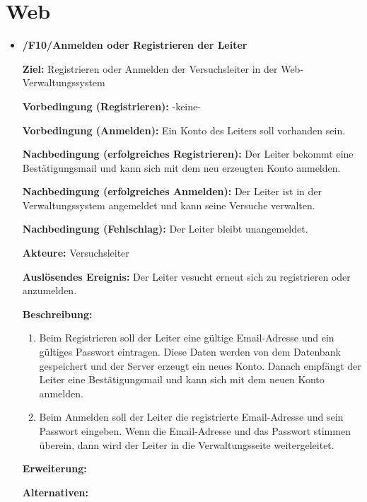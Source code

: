 \documentclass[a4paper]{scrreprt}
\begin{document}
		\section{Web}
	        \begin{itemize}
	            \item \textbf{/F10/Anmelden oder Registrieren der Leiter}
		
	            	\par \textbf{Ziel: }Registrieren oder Anmelden der Versuchsleiter in der Web-Verwaltungssystem
	            	\par \textbf{Vorbedingung (Registrieren): }-keine-
	            	\par \textbf{Vorbedingung (Anmelden): }Ein Konto des Leiters soll vorhanden sein.
	            	\par \textbf{Nachbedingung (erfolgreiches Registrieren): }Der Leiter bekommt eine Bestätigungsmail und kann sich mit dem neu erzeugten Konto anmelden.
	            	\par \textbf{Nachbedingung (erfolgreiches Anmelden): }Der Leiter ist in der Verwaltungssystem angemeldet und kann seine Versuche verwalten.
	            	\par \textbf{Nachbedingung (Fehlschlag): }Der Leiter bleibt unangemeldet.
	            	\par \textbf{Akteure: }Versuchsleiter
	            	\par \textbf{Auslösendes Ereignis: }Der Leiter vesucht erneut sich zu registrieren oder anzumelden.
	            	\par \textbf{Beschreibung: }
		            	\begin{enumerate}
		            		\item Beim Registrieren soll der Leiter eine gültige Email-Adresse und ein gültiges Passwort eintragen. Diese Daten werden von dem Datenbank gespeichert und der Server erzeugt ein neues Konto. Danach empfängt der Leiter eine Bestätigungsmail und kann sich mit dem neuen Konto anmelden.
			            	\item Beim Anmelden soll der Leiter die registrierte Email-Adresse und sein Passwort eingeben. Wenn die Email-Adresse und das Passwort stimmen überein, dann wird der Leiter in die Verwaltungsseite weitergeleitet.
		            	\end{enumerate}
	            	\par \textbf{Erweiterung: }
	            	\par \textbf{Alternativen: }
	            	

\end{itemize}
\end{document}

